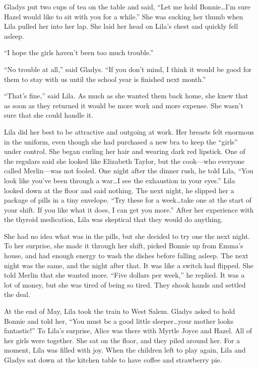 \documentclass[
  american,
  letterpaper,
]{book}
\begin{document}
Gladys put two cups of tea on the table and said, ``Let me hold
Bonnie\ldots I'm sure Hazel would like to sit with you for a while.''
She was sucking her thumb when Lila pulled her into her lap. She laid
her head on Lila's chest and quickly fell asleep.

``I hope the girls haven't been too much trouble.''

``No trouble at all,'' said Gladys. ``If you don't mind, I think it
would be good for them to stay with us until the school year is finished
next month.''

``That's fine,'' said Lila. As much as she wanted them back home, she
knew that as soon as they returned it would be more work and more
expense. She wasn't sure that she could handle it.

Lila did her best to be attractive and outgoing at work. Her breasts
felt enormous in the uniform, even though she had purchased a new bra to
keep the ``girls'' under control. She began curling her hair and wearing
dark red lipstick. One of the regulars said she looked like Elizabeth
Taylor, but the cook---who everyone called Merlin---was not fooled. One
night after the dinner rush, he told Lila, ``You look like you've been
through a war\ldots I see the exhaustion in your eyes.'' Lila looked
down at the floor and said nothing. The next night, he slipped her a
package of pills in a tiny envelope. ``Try these for a week\ldots take
one at the start of your shift. If you like what it does, I can get you
more.'' After her experience with the thyroid medication, Lila was
skeptical that they would do anything.

She had no idea what was in the pills, but she decided to try one the
next night. To her surprise, she made it through her shift, picked
Bonnie up from Emma's house, and had enough energy to wash the dishes
before falling asleep. The next night was the same, and the night after
that. It was like a switch had flipped. She told Merlin that she wanted
more. ``Five dollars per week,'' he replied. It was a lot of money, but
she was tired of being so tired. They shook hands and settled the deal.

At the end of May, Lila took the train to West Salem. Gladys asked to
hold Bonnie and told her, ``You must be a good little sleeper\ldots your
mother looks fantastic!'' To Lila's surprise, Alice was there with
Myrtle Joyce and Hazel. All of her girls were together. She sat on the
floor, and they piled around her. For a moment, Lila was filled with
joy. When the children left to play again, Lila and Gladys sat down at
the kitchen table to have coffee and strawberry pie.
\end{document}
